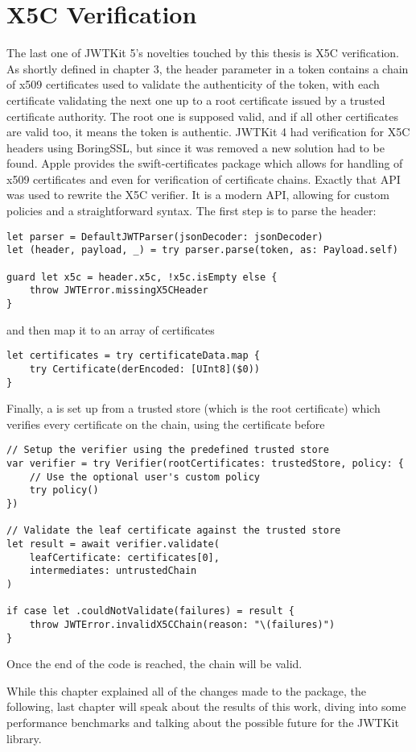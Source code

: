 \section{X5C Verification}
The last one of JWTKit 5's novelties touched by this thesis is X5C verification. 
As shortly defined in chapter 3, the  header parameter in a token contains a chain of \gls{x509} certificates used to validate the authenticity of the token, with each certificate validating the next one up to a root certificate issued by a trusted certificate authority. The root one is supposed valid, and if all other certificates are valid too, it means the token is authentic.
JWTKit 4 had verification for X5C headers using BoringSSL, but since it was removed a new solution had to be found. Apple provides the swift-certificates package which allows for handling of \gls{x509} certificates and even for verification of certificate chains.
Exactly that API was used to rewrite the X5C verifier. It is a modern API, allowing for custom policies and a straightforward syntax. The first step is to parse the  header:
\begin{verbatim}
let parser = DefaultJWTParser(jsonDecoder: jsonDecoder)
let (header, payload, _) = try parser.parse(token, as: Payload.self)

guard let x5c = header.x5c, !x5c.isEmpty else {
    throw JWTError.missingX5CHeader
}
\end{verbatim}
and then map it to an array of certificates
\begin{verbatim}
let certificates = try certificateData.map {
    try Certificate(derEncoded: [UInt8]($0))
}
\end{verbatim}
Finally, a  is set up from a trusted store (which is the root certificate) which verifies every certificate on the chain, using the certificate before
\begin{verbatim}
// Setup the verifier using the predefined trusted store
var verifier = try Verifier(rootCertificates: trustedStore, policy: {
    // Use the optional user's custom policy
    try policy()
})

// Validate the leaf certificate against the trusted store
let result = await verifier.validate(
    leafCertificate: certificates[0], 
    intermediates: untrustedChain
)

if case let .couldNotValidate(failures) = result {
    throw JWTError.invalidX5CChain(reason: "\(failures)")
}
\end{verbatim}
Once the end of the code is reached, the chain will be valid. \cite{jwtkit}

While this chapter explained all of the changes made to the package, the following, last chapter will speak about the results of this work, diving into some performance benchmarks and talking about the possible future for the JWTKit library.